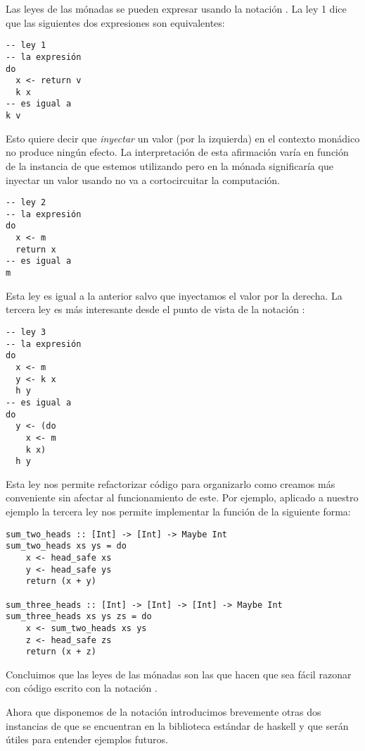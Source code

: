 Las leyes de las mónadas se pueden expresar usando la notación
. La ley 1 dice que las siguientes dos expresiones son
equivalentes:
\begin{verbatim}
-- ley 1
-- la expresión
do
  x <- return v
  k x
-- es igual a
k v
\end{verbatim}
Esto quiere decir que \textit{inyectar} un valor (por
la izquierda) en el contexto
monádico no produce ningún efecto. La interpretación de esta
afirmación varía en función de la instancia de  que estemos
utilizando pero en la mónada  significaría que
inyectar un valor usando  no va a cortocircuitar
la computación.
\begin{verbatim}
-- ley 2
-- la expresión
do
  x <- m
  return x
-- es igual a
m
\end{verbatim}
Esta ley es igual a la anterior salvo que inyectamos el valor
por la derecha. La tercera ley es más interesante desde el punto
de vista de la notación :
\begin{verbatim}
-- ley 3
-- la expresión
do
  x <- m
  y <- k x
  h y
-- es igual a
do
  y <- (do
    x <- m
    k x)
  h y
\end{verbatim}
Esta ley nos permite refactorizar código para organizarlo como
creamos más conveniente sin afectar al funcionamiento
de este. Por ejemplo, aplicado a nuestro ejemplo
 la tercera ley nos permite implementar
la función de la siguiente forma:
\begin{verbatim}
sum_two_heads :: [Int] -> [Int] -> Maybe Int
sum_two_heads xs ys = do
    x <- head_safe xs
    y <- head_safe ys
    return (x + y)

sum_three_heads :: [Int] -> [Int] -> [Int] -> Maybe Int
sum_three_heads xs ys zs = do
    x <- sum_two_heads xs ys
    z <- head_safe zs
    return (x + z)
\end{verbatim}
Concluimos que las leyes de las mónadas son las que hacen que
sea fácil razonar con código escrito con la notación .

Ahora que disponemos de la notación 
introducimos brevemente otras dos instancias de  que
se encuentran en la biblioteca estándar de haskell y que serán
útiles para entender ejemplos futuros.

